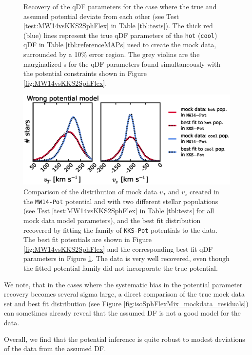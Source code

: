 \begin{figure}[!htb]
\caption{Recovery of the qDF parameters for the case where the true and assumed potential deviate from each other (see Test \ref{test:MW14vsKKS2SphFlex} in Table \ref{tbl:tests}). The thick red (blue) lines represent the true qDF parameters of the \texttt{hot} (\texttt{cool}) qDF in Table \ref{tbl:referenceMAPs} used to create the mock data, surrounded by a 10\% error region. The grey violins are the marginalized \pdf{}s for the qDF parameters found simultaneously with the potential constraints shown in Figure \ref{fig:MW14vsKKS2SphFlex}.}
\label{fig:MW14vsKKS2SphFlex_violins}
\end{figure}


\begin{figure}[!htbp]
\centering
\includegraphics[width=\columnwidth]{figs/MW14vsKKS2SphFlex_mockdata_residuals_2.eps}
\caption{Comparison of the distribution of mock data $v_T$ and $v_z$ created in the \texttt{MW14-Pot} potential and with two different stellar populations (see Test \ref{test:MW14vsKKS2SphFlex} in Table \ref{tbl:tests} for all mock data model parameters), and the best fit distribution recovered by fitting the family of \texttt{KKS-Pot} potentials to the data. The best fit potentials are shown in Figure \ref{fig:MW14vsKKS2SphFlex} and the corresponding best fit qDF parameters in Figure \ref{fig:MW14vsKKS2SphFlex_violins}. The data is very well recovered, even though the fitted potential family did not incorporate the true potential.}
\label{fig:MW14vsKKS2SphFlex_mockdata_residuals}
\end{figure}





We note, that in the cases where the systematic bias in the potential parameter recovery becomes several sigma large, a direct comparison of the true mock data set and best fit distribution (see Figure \ref{fig:isoSphFlexMix_mockdata_residuals}) can sometimes already reveal that the assumed DF is not a good model for the data.

Overall, we find that the potential inference is quite robust to modest deviations of the data from the assumed DF. 



